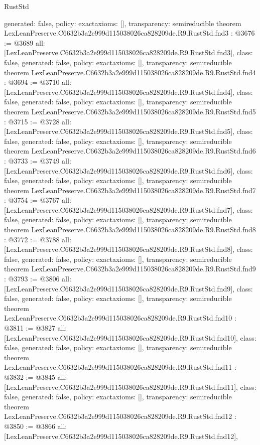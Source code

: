 \begin{lexlean}{RustStd}
\begin{coremodule}
{  generated: false,
  policy: exact{axioms: []},
  transparency: semireducible
}
theorem LexLeanPreserve.C6632b3a2e999d115038026ca828209de.R9.RustStd.fnd3 : @3676 := @3689 {
  all: [LexLeanPreserve.C6632b3a2e999d115038026ca828209de.R9.RustStd.fnd3],
  class: false,
  generated: false,
  policy: exact{axioms: []},
  transparency: semireducible
}
theorem LexLeanPreserve.C6632b3a2e999d115038026ca828209de.R9.RustStd.fnd4 : @3694 := @3710 {
  all: [LexLeanPreserve.C6632b3a2e999d115038026ca828209de.R9.RustStd.fnd4],
  class: false,
  generated: false,
  policy: exact{axioms: []},
  transparency: semireducible
}
theorem LexLeanPreserve.C6632b3a2e999d115038026ca828209de.R9.RustStd.fnd5 : @3715 := @3728 {
  all: [LexLeanPreserve.C6632b3a2e999d115038026ca828209de.R9.RustStd.fnd5],
  class: false,
  generated: false,
  policy: exact{axioms: []},
  transparency: semireducible
}
theorem LexLeanPreserve.C6632b3a2e999d115038026ca828209de.R9.RustStd.fnd6 : @3733 := @3749 {
  all: [LexLeanPreserve.C6632b3a2e999d115038026ca828209de.R9.RustStd.fnd6],
  class: false,
  generated: false,
  policy: exact{axioms: []},
  transparency: semireducible
}
theorem LexLeanPreserve.C6632b3a2e999d115038026ca828209de.R9.RustStd.fnd7 : @3754 := @3767 {
  all: [LexLeanPreserve.C6632b3a2e999d115038026ca828209de.R9.RustStd.fnd7],
  class: false,
  generated: false,
  policy: exact{axioms: []},
  transparency: semireducible
}
theorem LexLeanPreserve.C6632b3a2e999d115038026ca828209de.R9.RustStd.fnd8 : @3772 := @3788 {
  all: [LexLeanPreserve.C6632b3a2e999d115038026ca828209de.R9.RustStd.fnd8],
  class: false,
  generated: false,
  policy: exact{axioms: []},
  transparency: semireducible
}
theorem LexLeanPreserve.C6632b3a2e999d115038026ca828209de.R9.RustStd.fnd9 : @3793 := @3806 {
  all: [LexLeanPreserve.C6632b3a2e999d115038026ca828209de.R9.RustStd.fnd9],
  class: false,
  generated: false,
  policy: exact{axioms: []},
  transparency: semireducible
}
theorem LexLeanPreserve.C6632b3a2e999d115038026ca828209de.R9.RustStd.fnd10 : @3811 := @3827 {
  all: [LexLeanPreserve.C6632b3a2e999d115038026ca828209de.R9.RustStd.fnd10],
  class: false,
  generated: false,
  policy: exact{axioms: []},
  transparency: semireducible
}
theorem LexLeanPreserve.C6632b3a2e999d115038026ca828209de.R9.RustStd.fnd11 : @3832 := @3845 {
  all: [LexLeanPreserve.C6632b3a2e999d115038026ca828209de.R9.RustStd.fnd11],
  class: false,
  generated: false,
  policy: exact{axioms: []},
  transparency: semireducible
}
theorem LexLeanPreserve.C6632b3a2e999d115038026ca828209de.R9.RustStd.fnd12 : @3850 := @3866 {
  all: [LexLeanPreserve.C6632b3a2e999d115038026ca828209de.R9.RustStd.fnd12],
}
\end{coremodule}
\end{lexlean}
